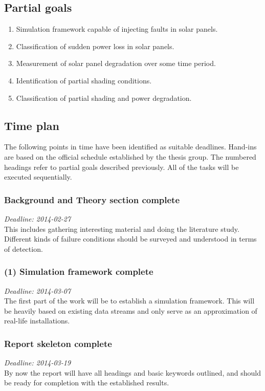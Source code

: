 \documentclass[a4paper,11pt]{article}
\begin{document}
\subsection*{Partial goals}
\begin{enumerate}
\item Simulation framework capable of injecting faults in solar panels.
\item Classification of sudden power loss in solar panels.
\item Measurement of solar panel degradation over some time period.
\item Identification of partial shading conditions.
\item Classification of partial shading and power degradation.
\end{enumerate}

\clearpage
\subsection*{Time plan}
The following points in time have been identified as suitable deadlines.
Hand-ins are based on the official schedule established by the thesis group.
The numbered headings refer to partial goals described previously.
All of the tasks will be executed sequentially.

\subsubsection*{Background and Theory section complete}
\noindent
\emph{Deadline: 2014-02-27}\\
\noindent
This includes gathering interesting material and doing the literature study.
Different kinds of failure conditions should be surveyed and understood in terms of detection.

\subsubsection*{(1) Simulation framework complete}
\noindent
\emph{Deadline: 2014-03-07}\\
\noindent
The first part of the work will be to establish a simulation framework.
This will be heavily based on existing data streams and only serve as an approximation of real-life installations.

\subsubsection*{Report skeleton complete}
\noindent
\emph{Deadline: 2014-03-19}\\
\noindent
By now the report will have all headings and basic keywords outlined, and should be ready for completion with the established results.
\end{document}

